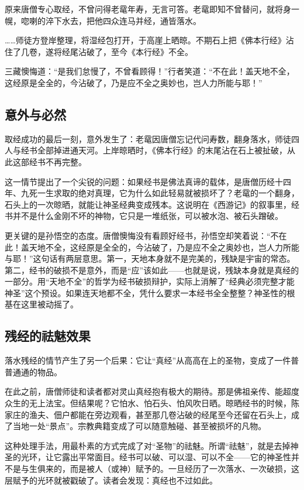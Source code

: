 \documentclass{ctexart}
\begin{document}
原来唐僧专心取经，不曾问得老鼋年寿，无言可答。老鼋即知不曾替问，就将身一幌，唿喇的淬下水去，把他四众连马并经，通皆落水。

……师徒方登岸整理，将湿经包打开，于高崖上晒晾。不期石上把《佛本行经》沾住了几卷，遂将经尾沾破了，至今《本行经》不全。

三藏懊悔道：“是我们怠慢了，不曾看顾得！”行者笑道：“不在此！盖天地不全，这经原是全全的，今沾破了，乃是应不全之奥妙也，岂人力所能与耶！”

\subsection{意外与必然}

取经成功的最后一刻，意外发生了：老鼋因唐僧忘记代问寿数，翻身落水，师徒四人与经书全部掉进通天河。上岸晾晒时，《佛本行经》的末尾沾在石上被扯破，从此这部经书不再完整。

这一情节提出了一个尖锐的问题：如果经书是佛法真谛的载体，是唐僧历经十四年、九死一生求取的绝对真理，它为什么如此轻易就被损坏了？老鼋的一个翻身，石头上的一次晾晒，就能让神圣经典变成残本。这说明在《西游记》的叙事里，经书并不是什么金刚不坏的神物，它只是一堆纸张，可以被水泡、被石头蹭破。

更关键的是孙悟空的态度。唐僧懊悔没有看顾好经书，孙悟空却笑着说：“不在此！盖天地不全，这经原是全全的，今沾破了，乃是应不全之奥妙也，岂人力所能与耶！”这句话有两层意思。第一，天地本身就不是完美的，残缺是宇宙的常态。第二，经书的破损不是意外，而是“应”该如此——也就是说，残缺本身就是真经的一部分。用“天地不全”的哲学为经书破损辩护，实际上消解了“经典必须完整才能神圣”这个预设。如果连天地都不全，凭什么要求一本经书全全整整？神圣性的根基在这里被动摇了。

\subsection{残经的祛魅效果}

落水残经的情节产生了另一个后果：它让“真经”从高高在上的圣物，变成了一件普普通通的物品。

在此之前，唐僧师徒和读者都对灵山真经抱有极大的期待。那是佛祖亲传、能超度众生的无上法宝。但结果呢？它怕水、怕石头、怕风吹日晒。晾晒经书的时候，陈家庄的渔夫、佃户都能在旁边观看，甚至那几卷沾破的经尾至今还留在石头上，成了当地一处“景点”。宗教典籍变成了可以随意触碰、甚至被损坏的凡物。

这种处理手法，用最朴素的方式完成了对“圣物”的祛魅。所谓“祛魅”，就是去掉神圣的光环，让它露出平常面目。经书可以破、可以湿、可以不全——它的神圣性并不是与生俱来的，而是被人（或神）赋予的。一旦经历了一次落水、一次破损，这层赋予的光环就被戳破了。读者会发现：真经也不过如此。
\end{document}
